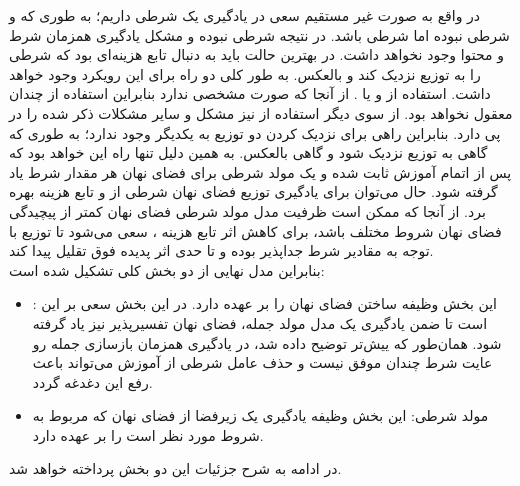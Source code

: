 در واقع به صورت غیر مستقیم سعی در یادگیری یک \wae{} شرطی داریم؛ به طوری که \encoder{} و \decoder{} شرطی نبوده اما \priordist{} شرطی باشد. در نتیجه \decoder{} شرطی نبوده و مشکل یادگیری همزمان شرط و محتوا وجود نخواهد داشت. در بهترین حالت باید به دنبال تابع هزینه‌ای بود که \priordist{} شرطی را به توزیع \marginal{} \encoder{} نزدیک کند و بالعکس. به طور کلی دو راه برای این رویکرد وجود خواهد داشت. استفاده از \gan{} و یا \mmd{}. از آنجا که \priordist{} صورت مشخصی ندارد بنابراین استفاده از  \mmd{} چندان معقول نخواهد بود. از سوی دیگر استفاده از \gan{} نیز مشکل \modecollapse{} و سایر مشکلات ذکر شده را در پی دارد. بنابراین راهی برای نزدیک کردن دو توزیع به یکدیگر وجود ندارد؛ به طوری که گاهی \priordist{} به توزیع \marginal{} \encoder{} نزدیک شود و گاهی بالعکس. به همین دلیل تنها راه این خواهد بود که پس از اتمام آموزش \autoencoder{} ثابت شده و یک مولد شرطی برای فضای نهان هر مقدار شرط یاد گرفته شود. حال می‌توان برای یادگیری توزیع فضای نهان شرطی از \normalizingflownet{} و تابع هزینه \maxlikelihood{} بهره برد. از آنجا که ممکن است ظرفیت مدل مولد شرطی فضای نهان کمتر از پیچیدگی فضای نهان شروط مختلف باشد، برای کاهش اثر \meanseeking{} تابع هزینه \maxlikelihood{}، سعی می‌شود تا توزیع \marginal{} \encoder{} با توجه به مقادیر شرط جدا‌پذیر بوده و تا حدی اثر پدیده فوق تقلیل پیدا کند.
\\
بنابراین مدل نهایی از دو بخش کلی تشکیل شده است:
\begin{itemize}
	\item \autoencoder{}:
	      این بخش وظیفه ساختن فضای نهان را بر عهده دارد. در این بخش سعی بر این است تا ضمن یادگیری یک مدل مولد جمله، فضای نهان تفسیرپذیر نیز یاد گرفته شود. همان‌طور که ییش‌تر توضیح داده شد، \vae{} در یادگیری همزمان بازسازی جمله رو عایت شرط چندان موفق نیست و حذف عامل شرطی از آموزش \decoder{} می‌تواند باعث رفع این دغدغه گردد.
	\item
	      مولد شرطی: این بخش وظیفه یادگیری یک زیرفضا از فضای نهان که مربوط به شروط مورد نظر است را بر عهده دارد.
\end{itemize}
در ادامه به شرح جزئیات این دو بخش پرداخته خواهد شد.

